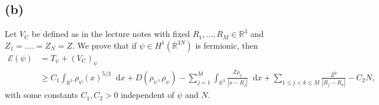 \documentclass[a4paper,11pt]{article}
\newcommand{\abs}[1]{\left\lvert #1 \right\rvert}
\newcommand*\diff{\mathop{}\!\mathrm{d}}
\newcommand{\R}{\mathbb{R}}
\numberwithin{equation}{section}
\begin{document}
\subsection*{(b)}
Let $ V_\text{C} $ be defined as in the lecture notes with fixed $ R_1,...,R_M\in\R^3 $ and $ Z_1=....=Z_N=Z $. We prove that if $ \psi\in H^1(\R^{3N}) $ is fermionic, then\begin{equation*}
\begin{aligned}
\mathcal{E}(\psi)&=T_{\psi}+(V_\text{C})_{\psi}\\
&\geq C_1\int_{\R^3}\rho_\psi(x)^{5/3}\diff x +D(\rho_\psi,\rho_\psi)-\sum_{j=1}^{M}\int_{\R^3}\frac{Z\rho_{\psi}}{\abs{x-R_j}}\diff x+\sum_{1\leq j< k\leq M}\frac{Z^2}{\abs{R_j-R_k}}-C_2N,
\end{aligned}
\end{equation*} 
with some constants $ C_1,C_2>0 $ independent of $ \psi $ and $ N $.
\end{document}
